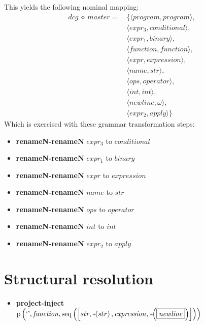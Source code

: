 This yields the following nominal mapping:
\begin{align*}\mathit{dcg} \:\diamond\: \mathit{master} =\:& \{\langle \mathit{program},\mathit{program}\rangle,\\
 & \langle \mathit{expr_3},\mathit{conditional}\rangle,\\
 & \langle \mathit{expr_1},\mathit{binary}\rangle,\\
 & \langle \mathit{function},\mathit{function}\rangle,\\
 & \langle \mathit{expr},\mathit{expression}\rangle,\\
 & \langle \mathit{name},str\rangle,\\
 & \langle \mathit{ops},\mathit{operator}\rangle,\\
 & \langle \mathit{int},int\rangle,\\
 & \langle \mathit{newline},\omega\rangle,\\
 & \langle \mathit{expr_2},\mathit{apply}\rangle\}\end{align*}
 Which is exercised with these grammar transformation steps:

{\footnotesize\begin{itemize}
\item \textbf{renameN-renameN} $\mathit{expr_3}$ to $\mathit{conditional}$
\item \textbf{renameN-renameN} $\mathit{expr_1}$ to $\mathit{binary}$
\item \textbf{renameN-renameN} $\mathit{expr}$ to $\mathit{expression}$
\item \textbf{renameN-renameN} $\mathit{name}$ to $str$
\item \textbf{renameN-renameN} $\mathit{ops}$ to $\mathit{operator}$
\item \textbf{renameN-renameN} $\mathit{int}$ to $int$
\item \textbf{renameN-renameN} $\mathit{expr_2}$ to $\mathit{apply}$
\end{itemize}}

\section{Structural resolution}
{\footnotesize\begin{itemize}
\item \textbf{project-inject}\\$\mathrm{p}\left(\text{`'},\mathit{function},\mathrm{seq}\left(\left[str, \plus \left(str\right), \mathit{expression}, \plus \left(\fbox{$\mathit{newline}$}\right)\right]\right)\right)$
\end{itemize}}
